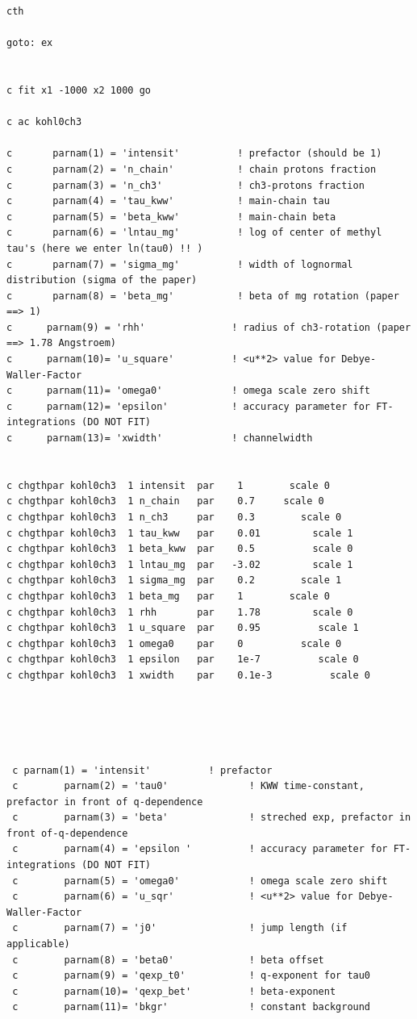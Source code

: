 \documentclass[11pt,fleqn]{book} %
\begin{document}
\begin{verbatim}
cth

goto: ex


c fit x1 -1000 x2 1000 go

c ac kohl0ch3

c       parnam(1) = 'intensit'          ! prefactor (should be 1)
c		parnam(2) = 'n_chain'           ! chain protons fraction
c       parnam(3) = 'n_ch3'             ! ch3-protons fraction
c       parnam(4) = 'tau_kww'           ! main-chain tau
c       parnam(5) = 'beta_kww'          ! main-chain beta
c       parnam(6) = 'lntau_mg'          ! log of center of methyl tau's (here we enter ln(tau0) !! )
c       parnam(7) = 'sigma_mg'          ! width of lognormal distribution (sigma of the paper)
c       parnam(8) = 'beta_mg'           ! beta of mg rotation (paper ==> 1)
c      parnam(9) = 'rhh'               ! radius of ch3-rotation (paper ==> 1.78 Angstroem)
c      parnam(10)= 'u_square'          ! <u**2> value for Debye-Waller-Factor
c      parnam(11)= 'omega0'            ! omega scale zero shift
c      parnam(12)= 'epsilon'           ! accuracy parameter for FT-integrations (DO NOT FIT)
c      parnam(13)= 'xwidth'            ! channelwidth


c chgthpar kohl0ch3  1 intensit  par    1        scale 0      
c chgthpar kohl0ch3  1 n_chain   par    0.7     scale 0
c chgthpar kohl0ch3  1 n_ch3     par    0.3        scale 0
c chgthpar kohl0ch3  1 tau_kww   par    0.01         scale 1
c chgthpar kohl0ch3  1 beta_kww  par    0.5 	     scale 0
c chgthpar kohl0ch3  1 lntau_mg  par   -3.02	     scale 1
c chgthpar kohl0ch3  1 sigma_mg  par    0.2        scale 1
c chgthpar kohl0ch3  1 beta_mg   par    1 	     scale 0
c chgthpar kohl0ch3  1 rhh       par    1.78 	     scale 0
c chgthpar kohl0ch3  1 u_square  par    0.95          scale 1
c chgthpar kohl0ch3  1 omega0    par    0          scale 0
c chgthpar kohl0ch3  1 epsilon   par    1e-7          scale 0
c chgthpar kohl0ch3  1 xwidth    par    0.1e-3          scale 0





 c parnam(1) = 'intensit'          ! prefactor
 c        parnam(2) = 'tau0'              ! KWW time-constant, prefactor in front of q-dependence
 c        parnam(3) = 'beta'              ! streched exp, prefactor in front of-q-dependence
 c        parnam(4) = 'epsilon '          ! accuracy parameter for FT-integrations (DO NOT FIT)
 c        parnam(5) = 'omega0'            ! omega scale zero shift
 c        parnam(6) = 'u_sqr'             ! <u**2> value for Debye-Waller-Factor
 c        parnam(7) = 'j0'                ! jump length (if applicable)
 c        parnam(8) = 'beta0'             ! beta offset
 c        parnam(9) = 'qexp_t0'           ! q-exponent for tau0
 c        parnam(10)= 'qexp_bet'          ! beta-exponent 
 c        parnam(11)= 'bkgr'              ! constant background 



\end{verbatim}
\end{document}
